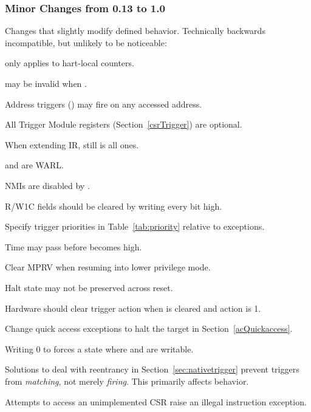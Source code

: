 \subsubsection{Minor Changes from 0.13 to 1.0}

\begin{steps}{Changes that slightly modify defined behavior. Technically backwards
incompatible, but unlikely to be noticeable:}
    \item \FcsrDcsrStopcount only applies to hart-local counters. 
    \item \FdmDmstatusVersion may be invalid when . 
    \item Address triggers (\RcsrMcontrol) may fire on any accessed address. 
    \item All Trigger Module registers (Section~\ref{csrTrigger}) are optional. 
    \item When extending IR, \RdtmBypass still is all ones. 
    \item \FcsrDcsrEbreaks and \FcsrDcsrEbreaku are WARL. 
    \item NMIs are disabled by \FcsrDcsrStepie. 
    \item R/W1C fields should be cleared by writing every bit high. 
    \item Specify trigger priorities in Table~\ref{tab:priority} relative to exceptions. 
    \item Time may pass before \FdmDmcontrolDmactive becomes high. 
    \item Clear MPRV when resuming into lower privilege mode. 
    \item Halt state may not be preserved across reset. 
    \item Hardware should clear trigger action when \FcsrTdataOneDmode is
        cleared and action is 1. 
    \item Change quick access exceptions to halt the target in
    Section~\ref{acQuickaccess}. 
    \item Writing 0 to \RcsrTdataOne forces a state where \RcsrTdataTwo and
        \RcsrTdataThree are writable. 
    \item Solutions to deal with reentrancy in Section~\ref{sec:nativetrigger}
        prevent triggers from {\em matching}, not merely {\em firing}. This primarily
        affects \RcsrIcount behavior. 
    \item Attempts to access an unimplemented CSR raise an illegal instruction
        exception. 
\end{steps}

